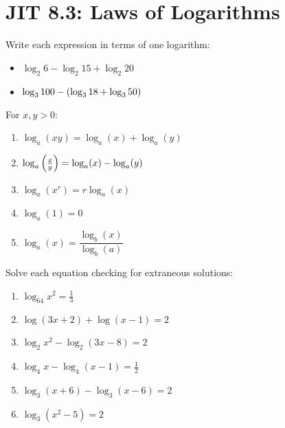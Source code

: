 \documentclass[mathNotesPreamble]{subfiles}
\begin{document}
\section{JIT 8.3: Laws of Logarithms}
  \begin{ex*}
    Write each expression in terms of one logarithm:\\
    
    \noindent
    \begin{minipage}{0.6\linewidth}
      \begin{itemize}
        \item[] $\log_2 6-\log_2 15+\log_2 20$\\[50pt]
        \item[] $\log_3 100-{\left(\log_3 18+\log_3 50\right)}$\\[50pt]
      \end{itemize}
    \end{minipage}%
    \begin{minipage}{0.4\linewidth}
      \begin{flushright}
        \begin{thmBox*}
          For $x,y>0$:
            \begin{enumerate}
              \item $\log_a(xy)=\log_a(x)+\log_a(y)$
              \item $\log_a{\left(\frac{x}{y}\right)}=\log_a(x)-\log_a(y)$
              \item $\log_a(x^r)=r\log_a(x)$
              \item $\log_a(1)=0$
              \item $\log_a(x)=\dfrac{\log_b(x)}{\log_b(a)}$
            \end{enumerate}
        \end{thmBox*}
      \end{flushright}
    \end{minipage}
  \end{ex*}
  \pagebreak
  \begin{ex*}
    Solve each equation checking for extraneous solutions:
    \begin{enumerate}[label=, itemsep=\stretch{1}]
      \item $\log_{64}x^2=\frac{1}{3}$
      \item $\log(3x+2)+\log(x-1)=2$
      \item $\log_2 x^2-\log_2(3x-8)=2$
      \item $\log_4 x-\log_4(x-1)=\frac{1}{2}$
      \item $\log_3(x+6)-\log_3(x-6)=2$
      \item $\log_3(x^2-5)=2$
    \end{enumerate}
  \end{ex*}
  \pagebreak
\end{document}
